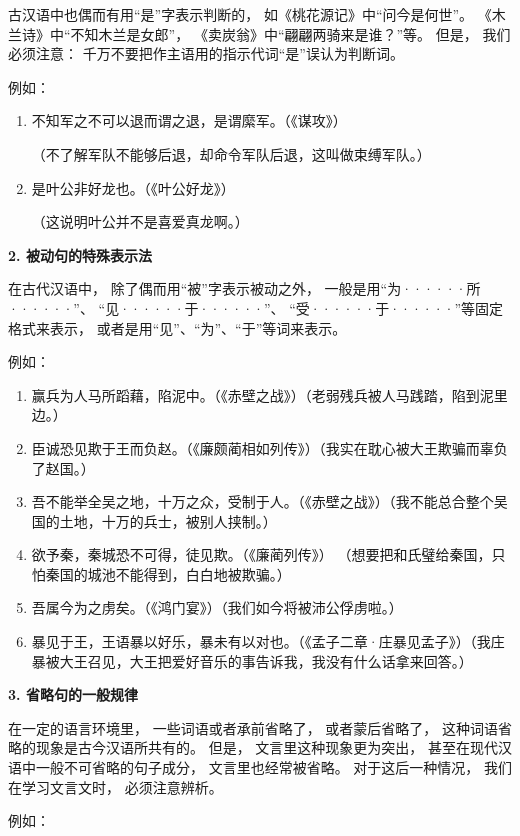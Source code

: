 古汉语中也偶而有用“是”字表示判断的，
如《桃花源记》中“问今是何世”。
《木兰诗》中“不知木兰是女郎”，
《卖炭翁》中“翩翩两骑来是谁？”等。
但是，
我们必须注意：
千万不要把作主语用的指示代词“是”误认为判断词。

例如：

\noindent
\begin{enumerate}[label=\textcircled{\arabic*}]
	\item 不知军之不可以退而谓之退，是谓縻军。（《谋攻》）
	
	（不了解军队不能够后退，却命令军队后退，这叫做束缚军队。）
	\item 是叶公非好龙也。（《叶公好龙》）
	
	（这说明叶公并不是喜爱真龙啊。）
\end{enumerate}

\textbf{2. 被动句的特殊表示法}

在古代汉语中，
除了偶而用“被”字表示被动之外，
一般是用“为······所······”、
“见······于······”、
“受······于······”等固定格式来表示，
或者是用“见”、“为”、“于”等词来表示。

例如：

\noindent
\begin{enumerate}[label=\textcircled{\arabic*}]
	\item 赢兵为人马所蹈藉，陷泥中。（《赤壁之战》）（老弱残兵被人马践踏，陷到泥里边。）
	\item 臣诚恐见欺于王而负赵。（《廉颇蔺相如列传》）（我实在耽心被大王欺骗而辜负了赵国。）
	\item 吾不能举全吴之地，十万之众，受制于人。（《赤壁之战》）（我不能总合整个吴国的土地，十万的兵士，被别人挟制。）
	\item 欲予秦，秦城恐不可得，徒见欺。（《廉蔺列传》） （想要把和氏璧给秦国，只怕秦国的城池不能得到，白白地被欺骗。）
	\item 吾属今为之虏矣。（《鸿门宴》）（我们如今将被沛公俘虏啦。）
	\item 暴见于王，王语暴以好乐，暴未有以对也。（《孟子二章·庄暴见孟子》）（我庄暴被大王召见，大王把爱好音乐的事告诉我，我没有什么话拿来回答。）
\end{enumerate}

\textbf{3. 省略句的一般规律}

在一定的语言环境里，
一些词语或者承前省略了，
或者蒙后省略了，
这种词语省略的现象是古今汉语所共有的。
但是，
文言里这种现象更为突出，
甚至在现代汉语中一般不可省略的句子成分，
文言里也经常被省略。
对于这后一种情况，
我们在学习文言文时，
必须注意辨析。

例如：

